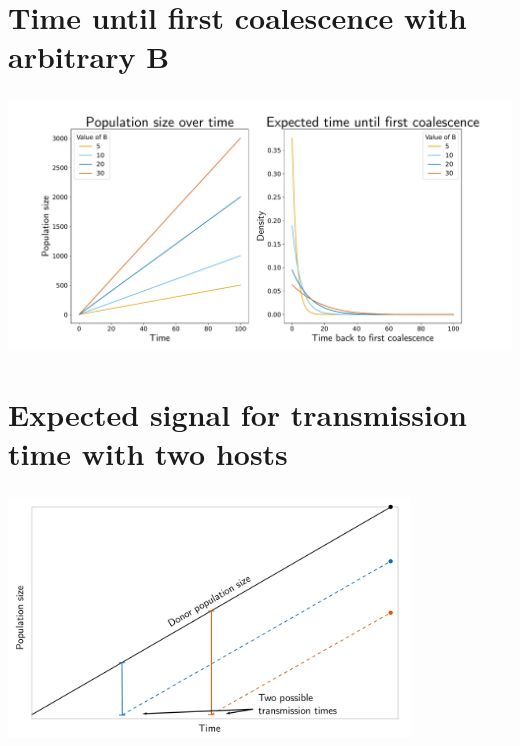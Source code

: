 \documentclass[aspectratio=169]{beamer}
\begin{document}
\section{Time until first coalescence with arbitrary B}

\begin{frame} \frametitle{\insertsection}

    \vspace{0.18cm}

    \centering\includegraphics[width=\textwidth]{images/several-b}
        

\end{frame}

\section{Expected signal for transmission time with two hosts}

\begin{frame} \frametitle{\insertsection}

    \centering\includegraphics[width=0.8\textwidth]{images/linear-time-location}

\end{frame}
\end{document}
